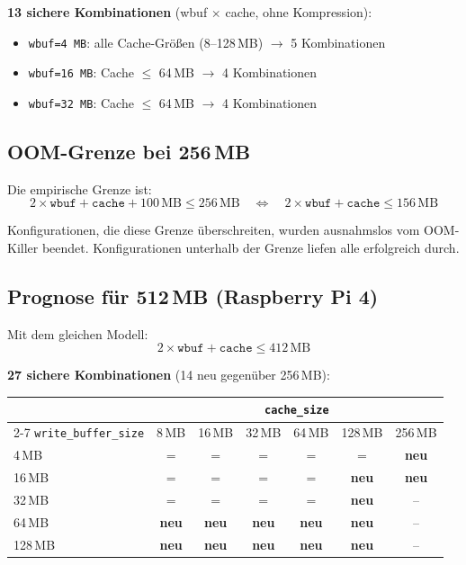 \documentclass[11pt,a4paper]{scrartcl}
\begin{document}
\textbf{13 sichere Kombinationen} (wbuf $\times$ cache, ohne Kompression):
\begin{itemize}[nosep]
  \item \texttt{wbuf=4\,MB}: alle Cache-Gr\"o\ss en (8--128\,MB) $\rightarrow$ 5 Kombinationen
  \item \texttt{wbuf=16\,MB}: Cache $\leq$ 64\,MB $\rightarrow$ 4 Kombinationen
  \item \texttt{wbuf=32\,MB}: Cache $\leq$ 64\,MB $\rightarrow$ 4 Kombinationen
\end{itemize}

\subsection*{OOM-Grenze bei 256\,MB}

Die empirische Grenze ist:
\[
2 \times \texttt{wbuf} + \texttt{cache} + 100\,\text{MB} \leq 256\,\text{MB}
\quad\Leftrightarrow\quad
2 \times \texttt{wbuf} + \texttt{cache} \leq 156\,\text{MB}
\]

Konfigurationen, die diese Grenze \"uberschreiten, wurden ausnahmslos vom
OOM-Killer beendet. Konfigurationen unterhalb der Grenze liefen alle
erfolgreich durch.

\subsection*{Prognose f\"ur 512\,MB (Raspberry Pi 4)}

Mit dem gleichen Modell:
\[
2 \times \texttt{wbuf} + \texttt{cache} \leq 412\,\text{MB}
\]

\textbf{27 sichere Kombinationen} (14 neu gegen\"uber 256\,MB):

\begin{center}
\begin{tabular}{l *{6}{c}}
\toprule
 & \multicolumn{6}{c}{\texttt{cache\_size}} \\
\cmidrule(lr){2-7}
\texttt{write\_buffer\_size} & 8\,MB & 16\,MB & 32\,MB & 64\,MB & 128\,MB & 256\,MB \\
\midrule
4\,MB   & \textsf{=} & \textsf{=} & \textsf{=} & \textsf{=} & \textsf{=} & \textbf{neu} \\
16\,MB  & \textsf{=} & \textsf{=} & \textsf{=} & \textsf{=} & \textbf{neu} & \textbf{neu} \\
32\,MB  & \textsf{=} & \textsf{=} & \textsf{=} & \textsf{=} & \textbf{neu} & -- \\
64\,MB  & \textbf{neu} & \textbf{neu} & \textbf{neu} & \textbf{neu} & \textbf{neu} & -- \\
128\,MB & \textbf{neu} & \textbf{neu} & \textbf{neu} & \textbf{neu} & \textbf{neu} & -- \\
\bottomrule
\end{tabular}
\end{center}
\end{document}
